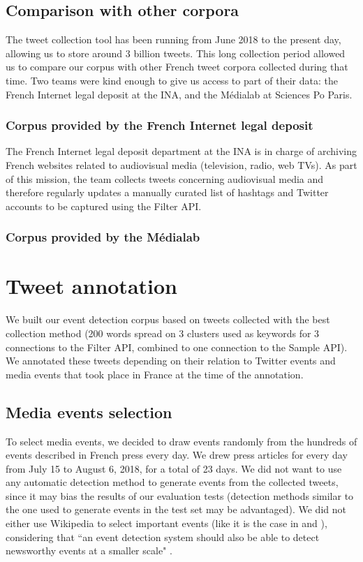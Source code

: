 \subsection{Comparison with other corpora}
The tweet collection tool has been running from June 2018 to the present day, allowing us to store around 3 billion tweets. This long collection period allowed us to compare our corpus with other French tweet corpora collected during that time. Two teams were kind enough to give us access to part of their data: the French Internet legal deposit at the INA, and the Médialab at Sciences Po Paris.

\subsubsection{Corpus provided by the French Internet legal deposit}
The French Internet legal deposit department at the INA is in charge of archiving French websites related to audiovisual media (television, radio, web TVs). As part of this mission, the team collects tweets concerning audiovisual media and therefore regularly updates a manually curated list of hashtags and Twitter accounts to be captured using the Filter API.


\subsubsection{Corpus provided by the Médialab}
\citet{cardon2019unfolding}

\section{Tweet annotation}

We built our event detection corpus based on tweets collected with the best collection method (200 words spread on 3 clusters used as keywords for 3 connections to the Filter API, combined to one connection to the Sample API). We annotated these tweets depending on their relation to  Twitter events and media events that took place in France at the time of the annotation.
	
	\subsection{Media events selection}
	To select media events, we decided to draw events randomly
from the hundreds of events described in French press every day. We drew press articles for every day from July 15 to August 6, 2018, for a total of 23 days. We did not want to use any automatic detection method to generate events from the collected tweets, since it may bias the results of our evaluation tests (detection methods similar to the one used to generate events in the test set may be advantaged). We did not either use Wikipedia to select important events (like it is the case in \citet{mcminn_building_2013} and \citet{petrovic_using_2012}), considering that ``an event detection system should also be able to detect newsworthy events at a smaller scale" \citep{hasan_survey_2018}. 


